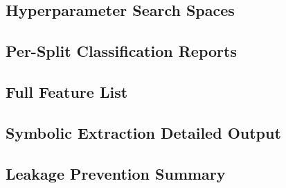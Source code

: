 \documentclass[12pt,a4paper,oneside]{article}
\begin{document}
\subsection{Hyperparameter Search Spaces}\label{app:hyperparams}

\subsection{Per-Split Classification Reports}\label{app:split_reports}

\subsection{Full Feature List}\label{app:features}

\subsection{Symbolic Extraction Detailed Output}\label{app:symbolic}

\subsection{Leakage Prevention Summary}\label{app:leakage_summary}
%


\end{document}
